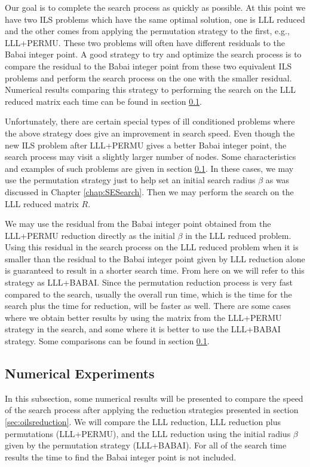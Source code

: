 \documentclass[12pt,Bold,letterpaper]{mcgilletdclass}
\newcommand{\vsp}{\vspace{\baselineskip}}
\begin{document}
Our goal is to complete the search process as quickly as possible. At this point we have two ILS problems which have the same optimal solution, one is LLL reduced and the other comes from applying the permutation strategy to the first, e.g., LLL+PERMU. These two problems will often have different residuals to the Babai integer point. A good strategy to try and optimize the search process is to compare the residual to the Babai integer point from these two equivalent ILS problems and perform the search process on the one with the smaller residual. Numerical results comparing this strategy to performing the search on the LLL reduced matrix each time can be found in section \ref{sec:ILSReductionResults}.

Unfortunately, there are certain special types of ill conditioned problems where the above strategy does give an improvement in search speed. Even though the new ILS problem after LLL+PERMU gives a better Babai integer point, the search process may visit a slightly larger number of nodes. Some characteristics and examples of such problems are given in section \ref{sec:ILSReductionResults}. In these cases, we may use the permutation strategy just to help set an initial search radius $\beta$ as was discussed in Chapter \ref{chap:SESearch}. Then we may perform the search on the LLL reduced matrix $R$.

We may use the residual from the Babai integer point obtained from the LLL+PERMU reduction directly as the initial $\beta$ in the LLL reduced problem. Using this residual in the search process on the LLL reduced problem when it is smaller than the residual to the Babai integer point given by LLL reduction alone is guaranteed to result in a shorter search time. From here on we will refer to this strategy as LLL+BABAI. Since the permutation reduction process is very fast compared to the search, usually the overall run time, which is the time for the search plus the time for reduction, will be faster as well. There are some cases where we obtain better results by using the matrix from the LLL+PERMU strategy in the search, and some where it is better to use the LLL+BABAI strategy. Some comparisons can be found in section \ref{sec:ILSReductionResults}.

\vsp \subsection{Numerical Experiments} \label{sec:ILSReductionResults}
In this subsection, some numerical results will be presented to compare the speed of the search process after applying the reduction strategies presented in section \ref{sec:oilsreduction}. We will compare the LLL reduction, LLL reduction plus permutations (LLL+PERMU), and the LLL reduction using the initial radius $\beta$ given by the permutation strategy (LLL+BABAI). For all of the search time results the time to find the Babai integer point is not included.
\end{document}
